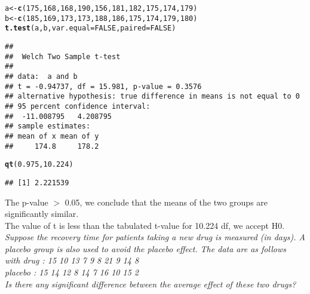 \documentclass{article}\usepackage[]{graphicx}\usepackage[]{xcolor}
\makeatletter
\newcommand{\hlnum}[1]{\textcolor[rgb]{0.686,0.059,0.569}{#1}}%
\newcommand{\hldef}[1]{\textcolor[rgb]{0.345,0.345,0.345}{#1}}%
\newcommand{\hlkwb}[1]{\textcolor[rgb]{0.69,0.353,0.396}{#1}}%
\newcommand{\hlkwc}[1]{\textcolor[rgb]{0.333,0.667,0.333}{#1}}%
\newcommand{\hlkwd}[1]{\textcolor[rgb]{0.737,0.353,0.396}{\textbf{#1}}}%
\newenvironment{kframe}{%
 \def\at@end@of@kframe{}%
 \ifinner\ifhmode%
  \def\at@end@of@kframe{\end{minipage}}%
  \begin{minipage}{\columnwidth}%
 \fi\fi%
 \def\FrameCommand##1{\hskip\@totalleftmargin \hskip-\fboxsep
 \colorbox{shadecolor}{##1}\hskip-\fboxsep
     \hskip-\linewidth \hskip-\@totalleftmargin \hskip\columnwidth}%
 \MakeFramed {\advance\hsize-\width
   \@totalleftmargin\z@ \linewidth\hsize
   \@setminipage}}%
 {\par\unskip\endMakeFramed%
 \at@end@of@kframe}
\newenvironment{knitrout}{}{} %
\makeatother
\begin{document}
\begin{knitrout}
\color{fgcolor}\begin{kframe}
\begin{alltt}
\hldef{a} \hlkwb{<-}\hlkwd{c}\hldef{(}\hlnum{175}\hldef{,} \hlnum{168}\hldef{,} \hlnum{168}\hldef{,} \hlnum{190}\hldef{,} \hlnum{156}\hldef{,} \hlnum{181}\hldef{,} \hlnum{182}\hldef{,} \hlnum{175}\hldef{,} \hlnum{174}\hldef{,} \hlnum{179}\hldef{)}
\hldef{b} \hlkwb{<-} \hlkwd{c}\hldef{(}\hlnum{185}\hldef{,} \hlnum{169}\hldef{,} \hlnum{173}\hldef{,} \hlnum{173}\hldef{,} \hlnum{188}\hldef{,} \hlnum{186}\hldef{,} \hlnum{175}\hldef{,} \hlnum{174}\hldef{,} \hlnum{179}\hldef{,} \hlnum{180}\hldef{)}
\hlkwd{t.test}\hldef{(a, b,} \hlkwc{var.equal} \hldef{=} \hlnum{FALSE}\hldef{,} \hlkwc{paired}\hldef{=}\hlnum{FALSE}\hldef{)}
\end{alltt}
\begin{verbatim}
## 
## 	Welch Two Sample t-test
## 
## data:  a and b
## t = -0.94737, df = 15.981, p-value = 0.3576
## alternative hypothesis: true difference in means is not equal to 0
## 95 percent confidence interval:
##  -11.008795   4.208795
## sample estimates:
## mean of x mean of y 
##     174.8     178.2
\end{verbatim}
\begin{alltt}
\hlkwd{qt}\hldef{(}\hlnum{0.975}\hldef{,} \hlnum{10.224}\hldef{)}
\end{alltt}
\begin{verbatim}
## [1] 2.221539
\end{verbatim}
\end{kframe}
\end{knitrout}
The p-value $>$ 0.05, we conclude that the means of the two groups are
significantly similar.\\
The value of t is less than the tabulated t-value for 10.224 df, we accept H0.
\emph{Suppose the recovery time for patients taking a new drug is measured (in
days). A placebo group is also used to avoid the placebo effect. The data are as
follows\\
with drug : 15 10 13 7 9 8 21 9 14 8\\
placebo : 15 14 12 8 14 7 16 10 15 2\\
Is there any significant difference between the average effect of these two drugs?}
\end{document}
